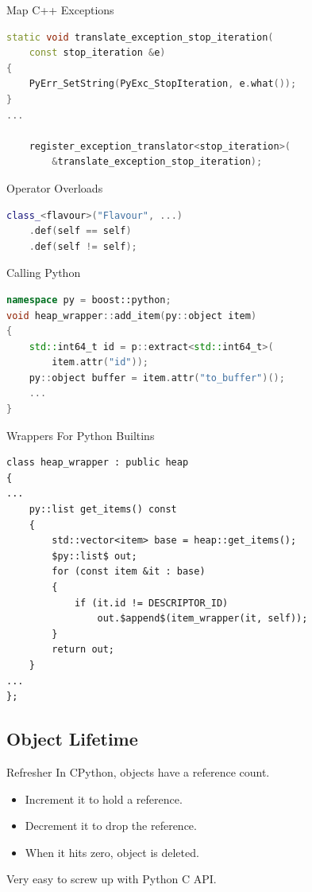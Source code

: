 \documentclass{beamer}
\begin{document}
\begin{frame}[fragile=singleslide]{Map C++ Exceptions}
  \begin{lstlisting}[language=c++]
static void translate_exception_stop_iteration(
    const stop_iteration &e)
{
    PyErr_SetString(PyExc_StopIteration, e.what());
}
...

    register_exception_translator<stop_iteration>(
        &translate_exception_stop_iteration);
  \end{lstlisting}
\end{frame}

\begin{frame}[fragile=singleslide]{Operator Overloads}
  \begin{lstlisting}[language=c++]
class_<flavour>("Flavour", ...)
    .def(self == self)
    .def(self != self);
  \end{lstlisting}
\end{frame}

\begin{frame}[fragile=singleslide]{Calling Python}
  \begin{lstlisting}[language=c++]
namespace py = boost::python;
void heap_wrapper::add_item(py::object item)
{
    std::int64_t id = p::extract<std::int64_t>(
        item.attr("id"));
    py::object buffer = item.attr("to_buffer")();
    ...
}
  \end{lstlisting}
\end{frame}

\begin{frame}[fragile=singleslide]{Wrappers For Python Builtins}
  \begin{lstlisting}[language={[extra]c++}]
class heap_wrapper : public heap
{
...
    py::list get_items() const
    {
        std::vector<item> base = heap::get_items();
        $py::list$ out;
        for (const item &it : base)
        {
            if (it.id != DESCRIPTOR_ID)
                out.$append$(item_wrapper(it, self));
        }
        return out;
    }
...
};
  \end{lstlisting}
\end{frame}

\subsection{Object Lifetime}

\begin{frame}{Refresher}
  In CPython, objects have a \alert{reference count}.
  \begin{itemize}
    \item Increment it to hold a reference.
    \item Decrement it to drop the reference.
    \item When it hits zero, object is deleted.
  \end{itemize}
  Very easy to screw up with Python C API.
\end{frame}
\end{document}
